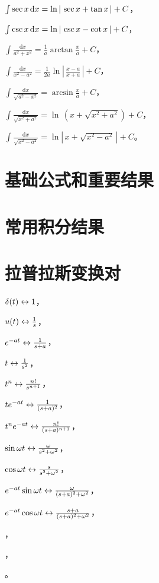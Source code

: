 \documentclass[UTF8]{ctexart}
\begin{document}
\begin{tabenum}[(1)]
    \item $ \int \sec x \,\mathrm{d} x =\ln |\,\sec x +\tan x\,|+C $，
    \item $ \int \csc x \,\mathrm{d} x =\ln |\,\csc x -\cot x\,|+C $，\\
    \item $ \int \frac{\mathrm{d}x}{a^2+x^2} =\frac{1}{a}\arctan \frac{x}{a}+C $，\\
    \item $ \int \frac{\mathrm{d}x}{x^2-a^2} =\frac{1}{2a}\ln |\,\frac{x-a}{x+a}\,|+C $，\\
    \item $ \int \frac{\mathrm{d}x}{\sqrt{a^2-x^2}} =\arcsin \frac{x}{a}+C $，\\
    \item $ \int \frac{\mathrm{d}x}{\sqrt{x^2+a^2}} =\ln \,(x+\sqrt{x^2+a^2})+C $，\\
    \item $ \int \frac{\mathrm{d}x}{\sqrt{x^2-a^2}} =\ln |\,x+\sqrt{x^2-a^2}\,|+C $。\\
  \end{tabenum}


\section{基础公式和重要结果}
\section{常用积分结果}


\section{拉普拉斯变换对}
  \begin{tabenum}[(1)] \qquad \qquad
    \item $ \delta(t)\leftrightarrow 1 $，
    \item $ u(t)\leftrightarrow \frac{1}{s} $，
    \item $ e^{-at}\leftrightarrow \frac{1}{s+a} $，\\
    \item $ t\leftrightarrow \frac{1}{s^2} $，
    \item $ t^n\leftrightarrow \frac{n!}{s^{n+1}} $，\\
    \item $ t e^{-at}\leftrightarrow \frac{1}{(s+a)^2} $，
    \item $ t^n e^{-at}\leftrightarrow \frac{n!}{(s+a)^{n+1}} $，\\
    \item $ \sin \omega t\leftrightarrow \frac{\omega}{s^2+\omega^2} $，
    \item $ \cos \omega t\leftrightarrow \frac{s}{s^2+\omega^2} $，\\
    \item $ e^{-at}\sin \omega t\leftrightarrow \frac{\omega}{(s+a)^2+\omega^2} $，
    \item $ e^{-at}\cos \omega t\leftrightarrow \frac{s+a}{(s+a)^2+\omega^2} $，\\
    \item $  $，
    \item $  $，\\
    \item $  $。
  \end{tabenum}
\end{document}
